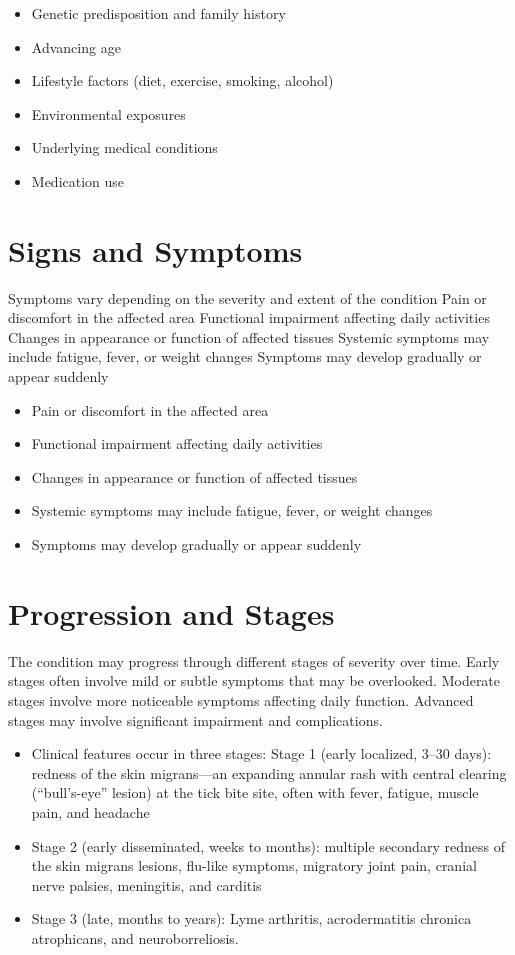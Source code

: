 \begin{itemize}[noitemsep]
  \item Genetic predisposition and family history
  \item Advancing age
  \item Lifestyle factors (diet, exercise, smoking, alcohol)
  \item Environmental exposures
  \item Underlying medical conditions
  \item Medication use
\end{itemize}
\section{Signs and Symptoms}
Symptoms vary depending on the severity and extent of the condition Pain or discomfort in the affected area Functional impairment affecting daily activities Changes in appearance or function of affected tissues Systemic symptoms may include fatigue, fever, or weight changes Symptoms may develop gradually or appear suddenly

\begin{itemize}[noitemsep]
  \item Pain or discomfort in the affected area
  \item Functional impairment affecting daily activities
  \item Changes in appearance or function of affected tissues
  \item Systemic symptoms may include fatigue, fever, or weight changes
  \item Symptoms may develop gradually or appear suddenly
\end{itemize}
\section{Progression and Stages}
The condition may progress through different stages of severity over time. Early stages often involve mild or subtle symptoms that may be overlooked. Moderate stages involve more noticeable symptoms affecting daily function. Advanced stages may involve significant impairment and complications.

\begin{itemize}[noitemsep]
  \item Clinical features occur in three stages: Stage 1 (early localized, 3--30 days): redness of the skin migrans---an expanding annular rash with central clearing (``bull's-eye'' lesion) at the tick bite site, often with fever, fatigue, muscle pain, and headache
  \item Stage 2 (early disseminated, weeks to months): multiple secondary redness of the skin migrans lesions, flu-like symptoms, migratory joint pain, cranial nerve palsies, meningitis, and carditis
  \item Stage 3 (late, months to years): Lyme arthritis, acrodermatitis chronica atrophicans, and neuroborreliosis.
\end{itemize}

